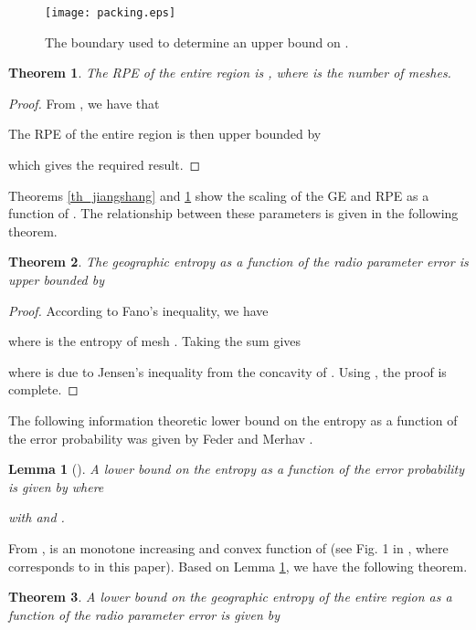 \documentclass[conference]{IEEEtran}
\newtheorem{Theo}{Theorem}
\newtheorem{Lemm}{Lemma}
\begin{document}
\begin{figure}[!t]
\centering
\texttt{[image: packing.eps]}
\caption{The boundary used to determine an upper bound on .} \label{fig_packing}
\end{figure}

\begin{Theo}\label{TH_pe_upper}
The RPE of the entire region is , where  is the number of meshes.
\end{Theo}
\begin{proof}
From , we have that

The RPE of the entire region is then upper bounded by

which gives the required result.
\end{proof}

Theorems \ref{th_jiangshang} and \ref{TH_pe_upper} show the scaling of the GE and RPE as a function of .
The relationship between these parameters is given in the following theorem.
\begin{Theo}\label{th_relation}
The geographic entropy as a function of the radio parameter error is upper bounded by

\end{Theo}

\begin{proof}
According to Fano's inequality, we have

where  is the entropy of mesh .
Taking the sum gives

where  is due to Jensen's inequality from the concavity of .
Using , the proof is complete.
\end{proof}
The following information theoretic lower bound on the entropy as a function of the error probability was given by Feder and Merhav \cite{Meir}.
\begin{Lemm}[\cite{Meir}]\label{lemma_meir}
A lower bound on the entropy  as a function of the error probability  is given by  where

with  and .
\end{Lemm}
From \cite{Meir},  is an monotone increasing and convex function of 
(see Fig. 1 in \cite{Meir}, where  corresponds to  in this paper).
Based on Lemma \ref{lemma_meir}, we have the following theorem.
\begin{Theo}\label{th_relation_lowerbound}
A lower bound on the geographic entropy of the entire region as a function of the radio parameter error  is given by

\end{Theo}
\end{document}
